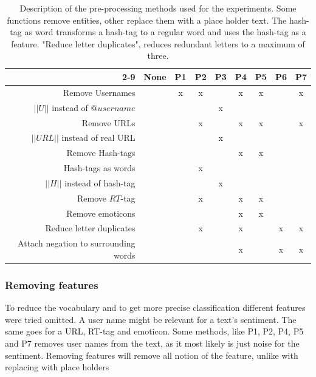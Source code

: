 \begin{table}[htb]
	\centering
	\begin{tabular}{|r||c|c|c|c|c|c|c|c|}

		\cline{2-9}
	 \multicolumn{1}{c| }{ } & \textbf{None} & \textbf{P1} & \textbf{P2} & \textbf{P3} & \textbf{P4} & \textbf{P5} & \textbf{P6} & \textbf{P7}  \\ \hline
		Remove Usernames                     & & x & x &   & x & x & & x \\ \hline
		$||U||$ instead of $@username$       & &   &   & x &   &   & & \\ \hline
		Remove URLs                          & &   & x &   & x & x & & x \\ \hline
		$||URL||$ instead of real URL        & &   &   & x &   &   & & \\ \hline
		Remove Hash-tags                     & &   &   &   & x & x & & \\ \hline
		Hash-tags as words                   & &   & x &   &   &   & & \\ \hline
		$||H||$ instead of hash-tag          & &   &   & x &   &   & & \\ \hline
		Remove $RT$-tag                      & &   & x &   & x & x & & \\ \hline
		Remove emoticons                     & &   &   &   & x & x & & \\ \hline
		Reduce letter duplicates             & &   & x &   & x &   & x & x \\ \hline
		Attach negation to surrounding words & &   &   &   & x &   & x & x \\ \hline
	\end{tabular}
	\caption[Description of used pre-processing methods]{Description of the pre-processing methods used for the experiments. Some functions remove entities, other replace them with a place holder text. The hash-tag as word transforms a hash-tag to a regular word and uses the hash-tag as a feature. "Reduce letter duplicates", reduces redundant letters to a maximum of three.}
	\label{tab:preproc_desc}
\end{table}

\subsubsection{Removing features}
 {To reduce the vocabulary and to get more precise classification different features were tried omitted. A user name might be relevant for a text's sentiment. The same goes for a URL, RT-tag and emoticon. Some methods, like P1, P2, P4, P5 and P7 removes user names from the text, as it most likely is just noise for the sentiment. Removing features will remove all notion of the feature, unlike with replacing with place holders}

